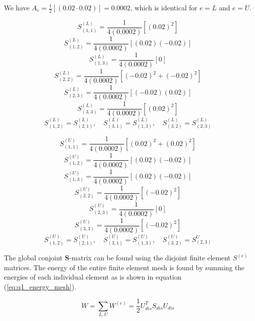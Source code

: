 \documentclass[11pt]{amsart}
\begin{document}
We have $A_e = \frac{1}{2}[(0.02 \cdot 0.02)] = 0.0002$, which is identical for $e = L$ and $e = U$.

$$
	S^{(L)}_{(1,1)} = \frac{1}{4(0.0002)}[(0.02)^2]
$$$$
	S^{(L)}_{(1,2)} = \frac{1}{4(0.0002)}[(0.02)(-0.02)]
$$$$
	S^{(L)}_{(1,3)} = \frac{1}{4(0.0002)}[0]
$$$$
	S^{(L)}_{(2,2)} = \frac{1}{4(0.0002)}[(-0.02)^2 + (-0.02)^2]
$$$$
	S^{(L)}_{(2,3)} = \frac{1}{4(0.0002)}[(-0.02)(0.02)]
$$$$
	S^{(L)}_{(3,3)} = \frac{1}{4(0.0002)}[(0.02)^2]
$$$$
	S^{(L)}_{(1,2)} = S^{(L)}_{(2,1)}, \quad S^{(L)}_{(3,1)} = S^{(L)}_{(1,3)}, \quad S^{(L)}_{(3,2)} = S^{(L)}_{(2,3)}
$$

\begin{center}
\end{center}

$$
	S^{(U)}_{(1,1)} = \frac{1}{4(0.0002)}[(0.02)^2 + (0.02)^2]
$$$$
	S^{(U)}_{(1,2)} = \frac{1}{4(0.0002)}[(0.02)(-0.02)]
$$$$
	S^{(U)}_{(1,3)} = \frac{1}{4(0.0002)}[(0.02)(-0.02)]
$$$$
	S^{(U)}_{(2,2)} = \frac{1}{4(0.0002)}[(-0.02)^2]
$$$$
	S^{(U)}_{(2,3)} = \frac{1}{4(0.0002)}[0]
$$$$
	S^{(U)}_{(3,3)} = \frac{1}{4(0.0002)}[(-0.02)^2]
$$$$
	S^{(U)}_{(1,2)} = S^{(U)}_{(2,1)}, \quad S^{(U)}_{(3,1)} = S^{(U)}_{(1,3)}, \quad S^{(U)}_{(3,2)} = S^{U}_{(2,3)}
$$

\begin{center}
\end{center}

The global conjoint \textbf{S}-matrix can be found using the disjoint finite element $S^{(e)}$ matrices. The energy of the entire finite element mesh is found by summing the energies of each individual element as is shown in equation (\ref{eq:q1_energy_mesh}).

\begin{equation}
	\label{eq:q1_energy_mesh}
	W = \sum_{L, U} W^{(e)} = \frac{1}{2} U^{T}_{dis} S_{dis} U_{dis}
\end{equation}
\end{document}
